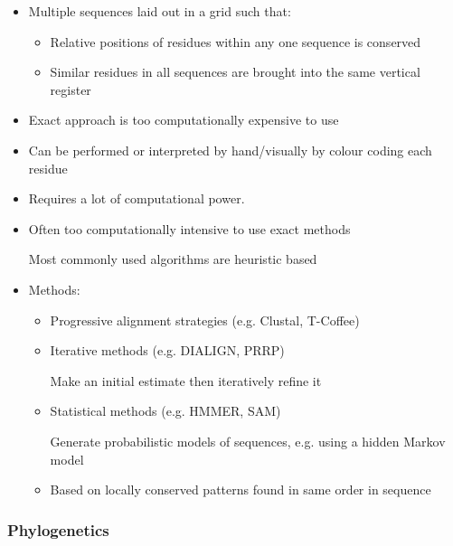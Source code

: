 \documentclass[a4paper]{article}
\begin{document}
\begin{itemize}
  \item
    Multiple sequences laid out in a grid such that:

    \begin{itemize}
      \item
        Relative positions of residues within any one sequence is conserved

      \item
        Similar residues in all sequences are brought into the same vertical
        register
    \end{itemize}

  \item
    Exact approach is too computationally expensive to use

  \item
    Can be performed or interpreted by hand/visually by colour coding each
    residue

  \item
    Requires a lot of computational power.

  \item
    Often too computationally intensive to use exact methods

    Most commonly used algorithms are heuristic based

  \item
    Methods:

    \begin{itemize}
      \item
        Progressive alignment strategies (e.g. Clustal, T-Coffee)

      \item
        Iterative methods (e.g. DIALIGN, PRRP)

        Make an initial estimate then iteratively refine it

      \item
        Statistical methods (e.g. HMMER, SAM)

        Generate probabilistic models of sequences, e.g. using a hidden Markov
        model

      \item
        Based on locally conserved patterns found in same order in sequence
    \end{itemize}
\end{itemize}

\subsubsection{Phylogenetics}
\end{document}
